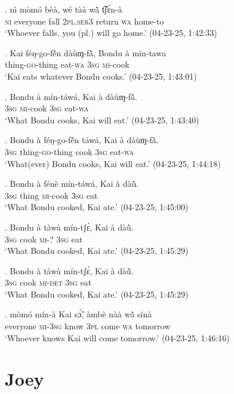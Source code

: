 \documentclass{assets/fieldnotes}
\begin{document}
\exg. nì mòmó bèà, wé tàà wã̀ t͡ʃɛ́n-à\\
\textsc{ni} everyone fall \textsc{2pl.ser3} return \textsc{wa} home-to\\
`Whoever falls, you (pl.) will go home.’ \hfill{(04-23-25, 1:42:33)}

\exg. Kai féŋ-go-fẽ́n dàùɱ-fã̀, Bondu à min-tawa\\
{} thing-\textsc{go}-thing eat-\textsc{wa} {} \textsc{3sg} \textsc{mi}-cook\\
`Kai eats whatever Bondu cooks.’ \hfill{(04-23-25, 1:43:01)}

\exg. Bondu à mín-táwá, Kai à dàùɱ-fã̀.\\
{} \textsc{3sg} \textsc{mi}-cook {} \textsc{3sg} eat-\textsc{wa}\\
`What Bondu cooks, Kai will eat.’ \hfill{(04-23-25, 1:43:40)}

\exg. Bondu à féŋ-go-fẽ́n táwá, Kai à dàùɱ-fã̀.\\
{} \textsc{3sg} thing-\textsc{go}-thing cook {} \textsc{3sg} eat-\textsc{wa}\\
`What(ever) Bondu cooks, Kai will eat.’ \hfill{(04-23-25, 1:44:18)}

\exg. Bondu à fénè mín-táwá, Kai à dàũ̀.\\
{} \textsc{3sg} thing \textsc{mi}-cook {} \textsc{3sg} eat\\
`What Bondu cooked, Kai ate.’ \hfill{(04-23-25, 1:45:00)}

\exg. Bondu à tàwà mín-tʃɛ̀, Kai à dàũ̀.\\
{} \textsc{3sg} cook \textsc{mi-?} {} \textsc{3sg} eat\\
`What Bondu cooked, Kai ate.’ \hfill{(04-23-25, 1:45:29)}\\

\exg. Bondu à tàwà mín-tʃɛ̀, Kai à dàũ̀.\\
{} \textsc{3sg} cook \textsc{mi-det} {} \textsc{3sg} eat\\
`What Bondu cooked, Kai ate.’ \hfill{(04-23-25, 1:45:29)}

\exg. mòmó mín-à Kai sɔ̃́, àmbè nàà wã̀ sínà\\
everyone \textsc{mi-3sg} {} know \textsc{3pl} come \textsc{wa} tomorrow\\
`Whoever knows Kai will come tomorrow.’ \hfill{(04-23-25, 1:46:16)}

\section{Joey}
\end{document}
